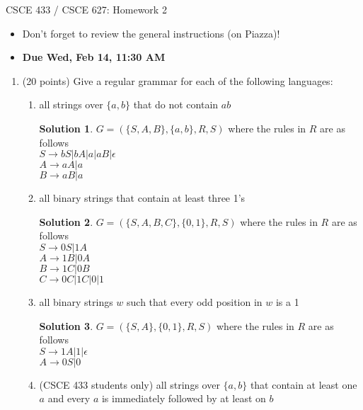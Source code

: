 \documentclass[12pt]{article}
\theoremstyle{definition}
\newtheorem*{solution}{Solution}
\begin{document}
\begin{center}
CSCE 433 / CSCE 627:  Homework 2 \\
\end{center}

\begin{itemize}
\item Don't forget to review the general instructions (on Piazza)!

\item {\bf Due Wed, Feb 14, 11:30 AM}
\end{itemize}

\begin{enumerate}

\item (20 points) Give a regular grammar for each of the following
languages:
  \begin{enumerate}
  \item all strings over $\{a,b\}$ that do not contain $ab$
\begin{solution}
	$G = (\{S,A,B\}, \{a,b\}, R, S)$ where the rules in $R$ are as follows\\ 
	$S \rightarrow bS | bA | a|aB| \epsilon$ \\ 
	$A \rightarrow aA |a$ \\
	$B \rightarrow aB |a$ 
	\end{solution}
  \item all binary strings that contain at least three 1's
  \begin{solution}
	$G = (\{S,A,B,C\}, \{0,1\}, R, S)$ where the rules in $R$ are as follows\\ 
	$S \rightarrow 0S | 1A $ \\ 
	$A \rightarrow 1B | 0A$ \\
	$B \rightarrow 1C | 0B$ \\
	$C \rightarrow 0C | 1C | 0 | 1$
	\end{solution}
  \item all binary strings $w$ such that every odd position in $w$ is a 1
    \begin{solution}
	$G = (\{S, A\}, \{0,1\}, R, S)$ where the rules in $R$ are as follows\\ 
	$S \rightarrow 1A | 1 | \epsilon$ \\ 
	$A \rightarrow 0S | 0$ 
	\end{solution}
  \item (CSCE 433 students only) all strings over $\{a,b\}$ that contain
        at least one $a$ and every $a$ is immediately followed by at least
        on $b$

\end{enumerate}
\end{enumerate}
\end{document}
